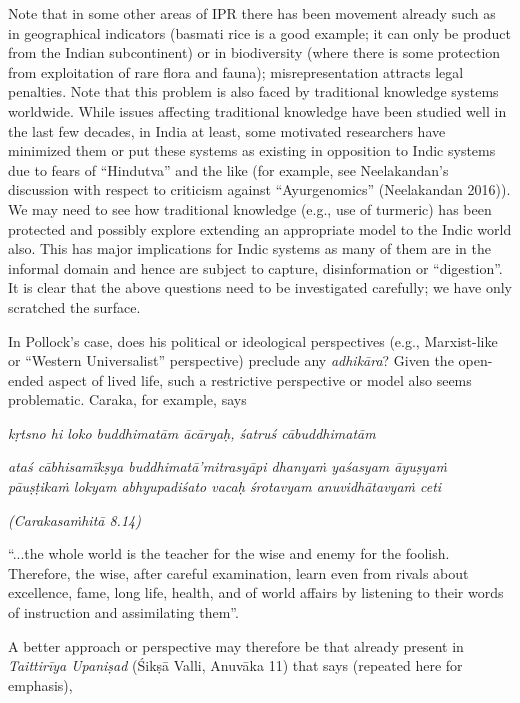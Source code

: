 Note that in some other areas of IPR there has been movement already such as in geographical indicators (basmati rice is a good example; it can only be product from the Indian subcontinent) or in biodiversity (where there is some protection from exploitation of rare flora and fauna); misrepresentation attracts legal penalties. Note that this problem is also faced by traditional knowledge systems worldwide. While issues affecting traditional knowledge have been studied well in the last few decades, in India at least, some motivated researchers have minimized them or put these systems as existing in opposition to Indic systems due to fears of “Hindutva” and the like (for example, see Neelakandan’s discussion with respect to criticism against “Ayurgenomics” (Neelakandan 2016)).  We may need to see how traditional knowledge (e.g., use of turmeric) has been protected and possibly explore extending an appropriate model to the Indic world also. This has major implications for Indic systems as many of them are in the informal domain and hence are subject to capture, disinformation or “digestion”. It is clear that the above questions need to be investigated carefully; we have only scratched the surface.

In Pollock’s case, does his political or ideological perspectives (e.g., Marxist-like or “Western Universalist” perspective) preclude any {\sl adhikāra}? Given the open-ended aspect of lived life, such a restrictive perspective or model also seems problematic. Caraka, for example, says
\vskip -3pt

\begin{myquote}
{\sl kṛtsno hi loko buddhimatām ācāryaḥ, śatruś cābuddhimatām}

{\sl ataś cābhisamīkṣya buddhimatā’mitrasyāpi dhanyaṁ yaśasyam āyuṣyaṁ pāuṣṭikaṁ lokyam abhyupadiśato vacaḥ śrotavyam anuvidhātavyaṁ ceti}

{\sl (Carakasaṁhitā 8.14)}

{\rm “...the whole world is the teacher for the wise and enemy for the foolish. Therefore, the wise, after careful examination, learn even from rivals about excellence, fame, long life, health, and of world affairs by listening to their words of instruction and assimilating them”.}
\end{myquote}
\vskip -3pt

A better approach or perspective may therefore be that already present in {\sl Taittirīya Upaniṣad} (Śikṣā Valli, Anuvāka 11) that says (repeated here for emphasis), 
\vskip -3pt


